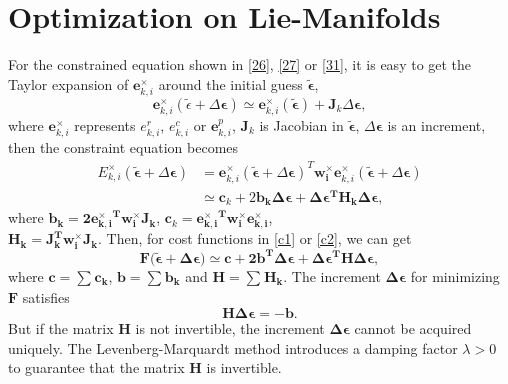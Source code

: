 \documentclass[journal]{IEEEtran}
\begin{document}
\section{Optimization on Lie-Manifolds}\label{a6}
For the constrained equation shown in \eqref{26}, \eqref{27} or \eqref{31}, it is easy to get the Taylor expansion of ${\mathbf e_{k,i}^{\times}}$ around the initial guess $\mathbf{\widetilde \epsilon}$, 
\begin{equation}\label{42}
{\mathbf e_{k,i}^{\times}}({{\widetilde \epsilon}+\Delta \mathbf \epsilon}) \simeq   {\mathbf e_{k,i}^{\times}}({\mathbf{\widetilde \epsilon}})+ \mathbf J_k \Delta \mathbf \epsilon,
\end{equation}
where $\mathbf e_{k,i}^{\times}$ represents $ e_{k,i}^{r}$, $ e_{k,i}^{c}$ or $\mathbf e_{k,i}^{p}$,
$\mathbf J_k$ is Jacobian in $\mathbf{\widetilde \epsilon}$, $\Delta \mathbf \epsilon$ is an increment, then the constraint equation becomes 
\begin{equation}\label{43}
\begin{array}{ll} E_{k,i}^{\times}(\mathbf{\widetilde \epsilon} + \Delta \mathbf \epsilon) &=  {\mathbf e_{k,i}^{\times}} (\mathbf{\widetilde \epsilon} + \Delta \mathbf \epsilon)^{T}\mathbf{w_i^{\times}}\mathbf e_{k,i}^{\times} (\mathbf{\widetilde \epsilon} + \Delta \mathbf \epsilon) \\
 &\simeq \mathbf c_k +2\mathbf{b_k\Delta \epsilon} + \mathbf {\Delta \epsilon^{T}H_k\Delta \epsilon},
\end{array}
\end{equation}
where 
$\mathbf{b_k = 2{\mathbf{e}_{k,i}^{\times}}^{T}w_i^{\times} J_k}$, $\mathbf c_k = \mathbf{{\mathbf{e}_{k,i}^{\times}}^{T}w_i^{\times} {\mathbf{e}_{k,i}^{\times}}}$, 
\\
$\mathbf{H_k = J_k^{T}w_i^{\times} J_k}$. Then, for cost functions in \eqref{c1} or \eqref{c2}, we can get
\begin{equation}\label{44}
\mathbf F(\mathbf{\widetilde \epsilon + \Delta \epsilon)} \simeq \mathbf {c +2b^{T}\Delta \epsilon + \Delta \epsilon^{T}H\Delta \epsilon},
\end{equation}
where $\mathbf{c=\sum_{}^{}c_k}$, $\mathbf{b=\sum_{}^{}b_k}$ and $\mathbf{H=\sum_{}^{}H_k}$. The increment $\mathbf {\Delta \epsilon}$ for minimizing $\mathbf F$ satisfies 
\begin{equation}\label{45}
\mathbf { H \Delta \epsilon = -b }.
\end{equation}
But if the matrix $\mathbf H$ is not invertible, the increment $\mathbf {\Delta \epsilon}$ cannot be acquired uniquely. The Levenberg-Marquardt \cite{Luo:2007cz} method introduces a damping factor $\lambda>0$ to guarantee that the matrix $\mathbf H$ is invertible.
\end{document}
